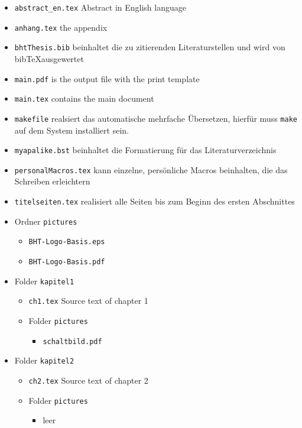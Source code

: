 \begin{itemize}
    \item \texttt{abstract\_en.tex} Abstract in English language
    \item \texttt{anhang.tex} the appendix
    \item \texttt{bhtThesis.bib} beinhaltet die zu zitierenden Literaturstellen und wird von bib\TeX ausgewertet 
    \item \texttt{main.pdf} is the output file with the print template
    \item \texttt{main.tex} contains the main document
    \item \texttt{makefile} realsiert das automatische mehrfache Übersetzen, hierfür muss \texttt{make} auf dem System installiert sein.
\item \texttt{myapalike.bst} beinhaltet die Formatierung für das
  Literaturverzeichnis 
\item \texttt{personalMacros.tex} kann einzelne, persönliche Macros beinhalten, die
  das Schreiben erleichtern
\item \texttt{titelseiten.tex} realisiert alle Seiten bis zum Beginn des ersten
  Abschnittes  

\item Ordner \texttt{pictures}
  \begin{itemize}
  \item \texttt{BHT-Logo-Basis.eps}
  \item \texttt{BHT-Logo-Basis.pdf}
  \end{itemize}

\item Folder \texttt{kapitel1}
  \begin{itemize}
  \item \texttt{ch1.tex} Source text of chapter 1
  \item Folder \texttt{pictures}
    \begin{itemize}
    \item \texttt{schaltbild.pdf}
    \end{itemize}
  \end{itemize}
  
\item Folder \texttt{kapitel2}
  \begin{itemize}
  \item \texttt{ch2.tex} Source text of chapter 2
  \item Folder \texttt{pictures}
    \begin{itemize}
    \item leer
    \end{itemize}
  \end{itemize}  
\end{itemize}

